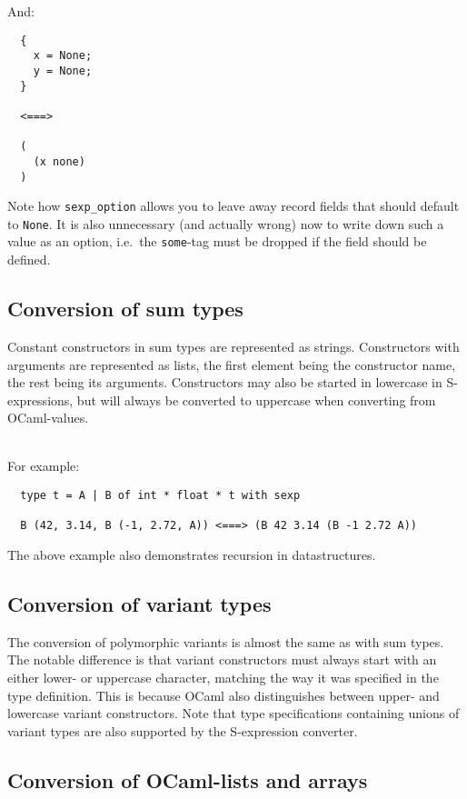\documentclass[a4paper]{article}
\begin{document}
\noindent And:

\begin{verbatim}
  {
    x = None;
    y = None;
  }

  <===>

  (
    (x none)
  )
\end{verbatim}

Note how \verb=sexp_option= allows you to leave away record fields
that should default to \verb=None=.  It is also unnecessary (and
actually wrong) now to write down such a value as an option, i.e.\
the \verb=some=-tag must be dropped if the field should be defined.

\subsection{Conversion of sum types}

Constant constructors in sum types are represented as strings.
Constructors with arguments are represented as lists, the first element
being the constructor name, the rest being its arguments.  Constructors
may also be started in lowercase in S-expressions, but will always be
converted to uppercase when converting from OCaml-values.\\
\\
{\samepage
\noindent For example:

\begin{verbatim}
  type t = A | B of int * float * t with sexp

  B (42, 3.14, B (-1, 2.72, A)) <===> (B 42 3.14 (B -1 2.72 A))
\end{verbatim}

\noindent The above example also demonstrates recursion in datastructures.
}

\subsection{Conversion of variant types}

The conversion of polymorphic variants is almost the same as with
sum types.  The notable difference is that variant constructors must
always start with an either lower- or uppercase character, matching
the way it was specified in the type definition.  This is because OCaml
also distinguishes between upper- and lowercase variant constructors.
Note that type specifications containing unions of variant types are
also supported by the S-expression converter.

\subsection{Conversion of OCaml-lists and arrays}
\end{document}
